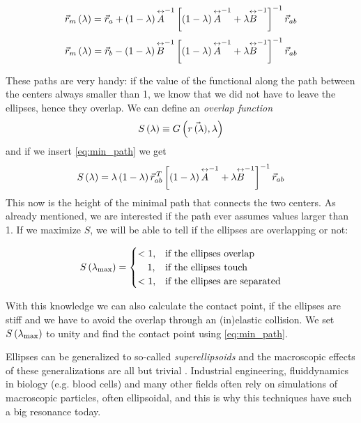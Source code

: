 $$
\vec{r}_m \left(\lambda\right) = \vec{r}_a +\left(1-\lambda\right) \overset{\leftrightarrow}{A}^{-1} \left[  \left(1-\lambda\right) \overset{\leftrightarrow}{A}^{-1} + \lambda \overset{\leftrightarrow}{B}^{-1}  \right]^{-1} \vec{r}_{ab}
$$
\begin{equation}
\vec{r}_m \left(\lambda\right) = \vec{r}_b -\left(1-\lambda\right) \overset{\leftrightarrow}{B}^{-1} \left[  \left(1-\lambda\right) \overset{\leftrightarrow}{A}^{-1} + \lambda \overset{\leftrightarrow}{B}^{-1}  \right]^{-1} \vec{r}_{ab}
\label{eq:min_path}
\end{equation}

These paths are very handy: if the value of the functional along the path between the centers always smaller than 1, we know that we did not have to leave the ellipses, hence they overlap. We can define an \emph{overlap function} 
\begin{equation}
S\left(\lambda\right) \equiv G\left(\vec{r\left(\lambda\right)},\lambda\right) 
\end{equation}
and if we insert \eqref{eq:min_path} we get
\begin{equation}
S\left(\lambda\right) = \lambda \left(1-\lambda\right) \vec{r}_{ab}^{\,T}\left[  \left(1-\lambda\right)\overset{\leftrightarrow}{A}^{-1}+ \lambda \overset{\leftrightarrow}{B}^{-1}   \right]^{-1}\vec{r}_{ab}
\end{equation}
This now is the height of the minimal path that connects the two centers. As already mentioned, we are interested if the path ever assumes values larger than 1. If we maximize $S$, we will be able to tell if the ellipses are overlapping or not:


\begin{equation}
S\left(\lambda_{\text{max}}\right) =\begin{cases}
  <1,  & \text{if the ellipses overlap}\\
  \,\,\,\,\,\,1,  & \text{if the ellipses touch}\\
  <1,  & \text{if the ellipses are separated}
\end{cases}
\end{equation}

With this knowledge we can also calculate the contact point, if the ellipses are stiff and we have to avoid the overlap through an (in)elastic collision. We set $S\left(\lambda_{\text{max}}\right)$ to unity and find the contact point using \eqref{eq:min_path}. 


Ellipses can be generalized to so-called \emph{superellipsoids} \citep{superellipsoids} and the macroscopic effects of these generalizations are all but trivial \citep{mms}. Industrial engineering, fluiddynamics in biology (e.g. blood cells) and many other fields often rely on simulations of macroscopic particles, often ellipsoidal, and this is why this techniques have such a big resonance today.


